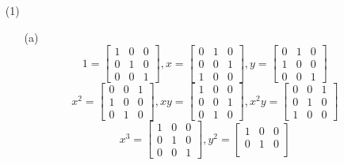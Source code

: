 %

\begin{itemize}
\item[(1)]
\begin{itemize}
\item[(a)]
$$1 = \begin{bmatrix}
1 & 0 & 0 \\
0 & 1 & 0 \\
0 & 0 & 1
\end{bmatrix}, x = \begin{bmatrix}
0 & 1 & 0 \\
0 & 0 & 1 \\
1 & 0 & 0
\end{bmatrix}, y = \begin{bmatrix}
0 & 1 & 0 \\
1 & 0 & 0 \\
0 & 0 & 1
\end{bmatrix}$$
$$x^2 = \begin{bmatrix}
0 & 0 & 1 \\
1 & 0 & 0 \\
0 & 1 & 0
\end{bmatrix}, xy = \begin{bmatrix}
1 & 0 & 0 \\
0 & 0 & 1 \\
0 & 1 & 0
\end{bmatrix}, x^2y = \begin{bmatrix}
0 & 0 & 1 \\
0 & 1 & 0 \\
1 & 0 & 0
\end{bmatrix}$$
$$x^3 = \begin{bmatrix}
1 & 0 & 0 \\
0 & 1 & 0 \\
0 & 0 & 1
\end{bmatrix}, y^2 = \begin{bmatrix}
1 & 0 & 0 \\
0 & 1 & 0 \\

\end{bmatrix}$$
\end{itemize}
\end{itemize}
